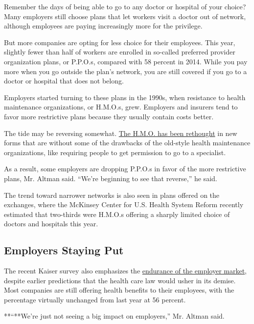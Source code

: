 Remember the days of being able to go to any doctor or hospital of your
choice? Many employers still choose plans that let workers visit a
doctor out of network, although employees are paying increasingly more
for the privilege.

But more companies are opting for less choice for their employees. This
year, slightly fewer than half of workers are enrolled in so-called
preferred provider organization plans, or P.P.O.s, compared with 58
percent in 2014. While you pay more when you go outside the plan's
network, you are still covered if you go to a doctor or hospital that
does not belong.

Employers started turning to these plans in the 1990s, when resistance
to health maintenance organizations, or H.M.O.s, grew. Employers and
insurers tend to favor more restrictive plans because they usually
contain costs better.

The tide may be reversing somewhat.
\href{http://www.nytimes.com/2016/02/29/business/trying-to-revive-hmos-but-without-those-scarlet-letters.html}{The
H.M.O. has been rethought} in new forms that are without some of the
drawbacks of the old-style health maintenance organizations, like
requiring people to get permission to go to a specialist.

As a result, some employers are dropping P.P.O.s in favor of the more
restrictive plans, Mr. Altman said. ``We're beginning to see that
reverse,'' he said.

The trend toward narrower networks is also seen in plans offered on the
exchanges, where the McKinsey Center for U.S. Health System Reform
recently estimated that two-thirds were H.M.O.s offering a sharply
limited choice of doctors and hospitals this year.

\hypertarget{employers-staying-put}{%
\subsection{Employers Staying Put}\label{employers-staying-put}}

The recent Kaiser survey also emphasizes the
\href{http://www.nytimes.com/2016/04/05/business/employers-keep-health-insurance-despite-affordable-care-act.html}{endurance
of the employer market}, despite earlier predictions that the health
care law would usher in its demise. Most companies are still offering
health benefits to their employees, with the percentage virtually
unchanged from last year at 56 percent.

**``**We're just not seeing a big impact on employers,'' Mr. Altman
said.

